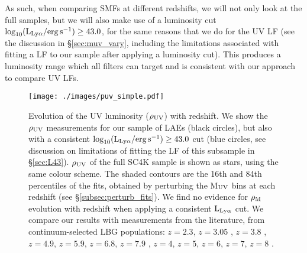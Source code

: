 \documentclass[a4paper,fleqn,usenatbib]{mnras}
\begin{document}
As such, when comparing SMFs at different redshifts, we will not only look at the full samples, but we will also make use of a luminosity cut $\log_{10} (\rm L_{Ly\alpha}/erg\,s^{-1}) \geq 43.0$, for the same reasons that we do for the UV LF (see the discussion in \S\ref{sec:muv_vary}, including the limitations associated with fitting a LF to our sample after applying a luminosity cut). This produces a luminosity range which all filters can target and is consistent with our approach to compare UV LFs.

%
%
\begin{figure*}
  \centering
  \texttt{[image: ./images/puv\_simple.pdf]}
  \caption{Evolution of the UV luminosity ($\rho_{\rm UV}$) with redshift. We show the $\rho_{\rm UV}$ measurements for our sample of LAEs (black circles), but also with a consistent $\log_{10} (\rm L_{Ly\alpha}/erg\,s^{-1}) \geq 43.0$ cut (blue circles, see discussion on limitations of fitting the LF of this subsample in \S\ref{sec:L43}). $\rho_{\rm UV}$ of the full SC4K sample is shown as stars, using the same colour scheme. The shaded contours are the 16th and 84th percentiles of the fits, obtained by perturbing the M$_{\rm UV}$ bins at each redshift (see \S\ref{subsec:perturb_fits}). We find no evidence for $\rho_{\rm M}$ evolution with redshift when applying a consistent ${\rm L_{Ly\alpha}}$ cut. We compare our results with measurements from the literature, from continuum-selected LBG populations: $z=2.3$, $z=3.05$ \citep{Reddy2009}, $z=3.8$ , $z=4.9$, $z=5.9$, $z=6.8$, $z=7.9$ \citep{Bouwens2015}, $z=4$, $z=5$, $z=6$, $z=7$, $z=8$ \citep{Finkelstein2015}.}
  \label{fig:SMD}
\end{figure*}
\end{document}

